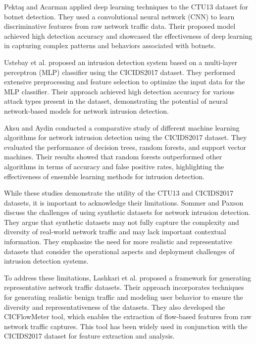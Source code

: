 Pektaş and Acarman \cite{pektacs2019deep} applied deep learning techniques to the CTU13 dataset for botnet detection. They used a convolutional neural network (CNN) to learn discriminative features from raw network traffic data. Their proposed model achieved high detection accuracy and showcased the effectiveness of deep learning in capturing complex patterns and behaviors associated with botnets.

Ustebay et al. \cite{ustebay2018intrusion} proposed an intrusion detection system based on a multi-layer perceptron (MLP) classifier using the CICIDS2017 dataset. They performed extensive preprocessing and feature selection to optimize the input data for the MLP classifier. Their approach achieved high detection accuracy for various attack types present in the dataset, demonstrating the potential of neural network-based models for network intrusion detection.

Aksu and Aydin \cite{aksu2018detecting} conducted a comparative study of different machine learning algorithms for network intrusion detection using the CICIDS2017 dataset. They evaluated the performance of decision trees, random forests, and support vector machines. Their results showed that random forests outperformed other algorithms in terms of accuracy and false positive rates, highlighting the effectiveness of ensemble learning methods for intrusion detection.

While these studies demonstrate the utility of the CTU13 and CICIDS2017 datasets, it is important to acknowledge their limitations. Sommer and Paxson \cite{sommer2010outside} discuss the challenges of using synthetic datasets for network intrusion detection. They argue that synthetic datasets may not fully capture the complexity and diversity of real-world network traffic and may lack important contextual information. They emphasize the need for more realistic and representative datasets that consider the operational aspects and deployment challenges of intrusion detection systems.

To address these limitations, Lashkari et al. \cite{lashkari2017characterization} proposed a framework for generating representative network traffic datasets. Their approach incorporates techniques for generating realistic benign traffic and modeling user behavior to ensure the diversity and representativeness of the datasets. They also developed the CICFlowMeter tool, which enables the extraction of flow-based features from raw network traffic captures. This tool has been widely used in conjunction with the CICIDS2017 dataset for feature extraction and analysis.

